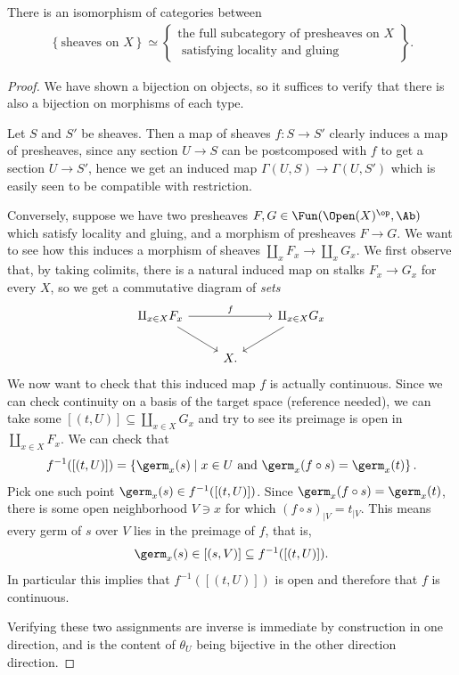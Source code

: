 \documentclass[11pt]{amsart}
\begin{document}
\begin{corollary}\label{cor:espace-etale-isomorphism-of-cats} 
There is an isomorphism of categories between
\begin{align*}
    \left\{ \text{sheaves on }X \right\} \simeq \left\{ \substack{\text{the full subcategory of presheaves on }X \\ \text{ satisfying locality and gluing}} \right\}.
\end{align*}
\end{corollary}
\begin{proof} We have shown a bijection on objects, so it suffices to verify that there is also a bijection on morphisms of each type.

Let $S$ and $S'$ be sheaves. Then a map of sheaves $f \colon S \to S'$ clearly induces a map of presheaves, since any section $U \to S$ can be postcomposed with $f$ to get a section $U \to S'$, hence we get an induced map $\Gamma(U,S) \to \Gamma(U,S')$ which is easily seen to be compatible with restriction.

Conversely, suppose we have two presheaves $F,G \in \Fun(\Open(X)^\op,\Ab)$ which satisfy locality and gluing, and a morphism of presheaves $F \to G$. We want to see how this induces a morphism of sheaves $\amalg_x F_x \to \amalg_x G_x$. We first observe that, by taking colimits, there is a natural induced map on stalks $F_x \to G_x$ for every $X$, so we get a commutative diagram of \emph{sets}
\[ \begin{tikzcd}
    \amalg_{x\in X}F_x \ar[rr,"f"]\ar[dr] &  & \amalg_{x\in X}G_x\ar[dl]\\
     & X. & 
\end{tikzcd} \]
We now want to check that this induced map $f$ is actually continuous. Since we can check continuity on a basis of the target space (reference needed), we can take some $[(t,U)] \subseteq \amalg_{x\in X}G_x$ and try to see its preimage is open in $\amalg_{x\in X}F_x$. We can check that
\begin{align*}
    f^{-1}([(t,U)]) = \left\{ \germ_x(s)  \mid x\in U \text{ and } \germ_x(f\circ s) = \germ_x(t) \right\}.
\end{align*}
Pick one such point $\germ_x(s) \in f^{-1}([(t,U)])$. Since $\germ_x(f\circ s) = \germ_x(t)$, there is some open neighborhood $V \ni x$ for which $(f\circ s)_{|V} = t_{|V}$. This means every germ of $s$ over $V$ lies in the preimage of $f$, that is,
\begin{align*}
    \germ_x(s) \in [(s,V)] \subseteq f^{-1}([(t,U)]).
\end{align*}
In particular this implies that $f^{-1}([(t,U)])$ is open and therefore that $f$ is continuous.

Verifying these two assignments are inverse is immediate by construction in one direction, and is the content of $\theta_U$ being bijective in the other direction direction.
\end{proof}
\end{document}
